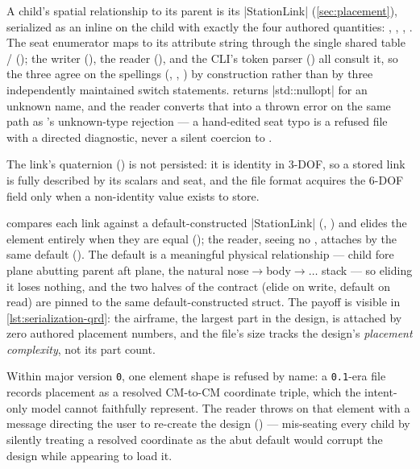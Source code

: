 A child's spatial relationship to its parent is its \cppinline|StationLink|
(\cref{sec:placement}), serialized as an inline  on the child with exactly
the four authored quantities: , , ,
. The seat enumerator maps to its attribute string through the single shared
table /
(); the writer
(), the reader
(), and the CLI's  token parser
() all consult it, so the three agree on the spellings
(, , ) by construction rather than by three
independently maintained switch statements.  returns
\cppinline|std::nullopt| for an unknown name, and the reader converts that into a thrown
error on the same path as 's unknown-type rejection --- a hand-edited seat
typo is a refused file with a directed diagnostic, never a silent coercion to .

The link's quaternion () is not persisted: it is identity in 3-DOF, so a
stored link is fully described by its scalars and seat, and the file format acquires the
6-DOF field only when a non-identity value exists to store.

\begin{designrule}
 compares each link against a default-constructed
\cppinline|StationLink| (,
) and elides the element entirely when they are
equal (); the reader, seeing no ,
attaches by the same default (). The default is
a meaningful physical relationship --- child fore plane abutting parent aft plane, the
natural nose$\to$body$\to\ldots$ stack --- so eliding it loses nothing, and the two halves
of the contract (elide on write, default on read) are pinned to the same
default-constructed struct. The payoff is visible in \cref{lst:serialization-qrd}: the
airframe, the largest part in the design, is attached by zero authored placement numbers,
and the file's size tracks the design's \emph{placement complexity}, not its part count.
\end{designrule}

Within major version \texttt{0}, one element shape is refused by name: a \texttt{0.1}-era
file records placement as a resolved CM-to-CM  coordinate triple, which
the intent-only model cannot faithfully represent. The reader throws on that element with
a message directing the user to re-create the design
() --- mis-seating every child by silently
treating a resolved coordinate as the abut default would corrupt the design while
appearing to load it.

